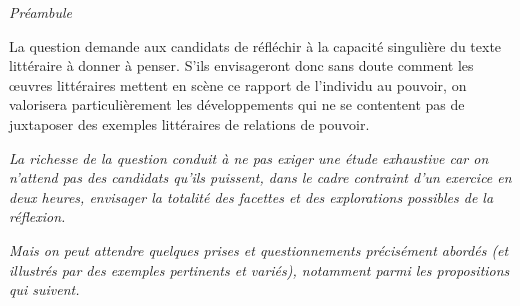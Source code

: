 {\textit{Préambule}

La question demande aux candidats de réfléchir à la capacité singulière du texte
littéraire à donner à penser. S'ils envisageront donc sans doute comment les œuvres
littéraires mettent en scène ce rapport de l'individu au pouvoir, on valorisera
particulièrement les développements qui ne se contentent pas de juxtaposer des
exemples littéraires de relations de pouvoir.

\textit{La richesse de la question conduit à ne pas exiger une étude exhaustive car on
n'attend pas des candidats qu'ils puissent, dans le cadre contraint d'un exercice en
deux heures, envisager la totalité des facettes et des explorations possibles de la
réflexion.}

\textit{Mais on peut attendre quelques prises et questionnements précisément abordés (et
illustrés par des exemples pertinents et variés), notamment parmi les propositions qui
suivent.}

}
